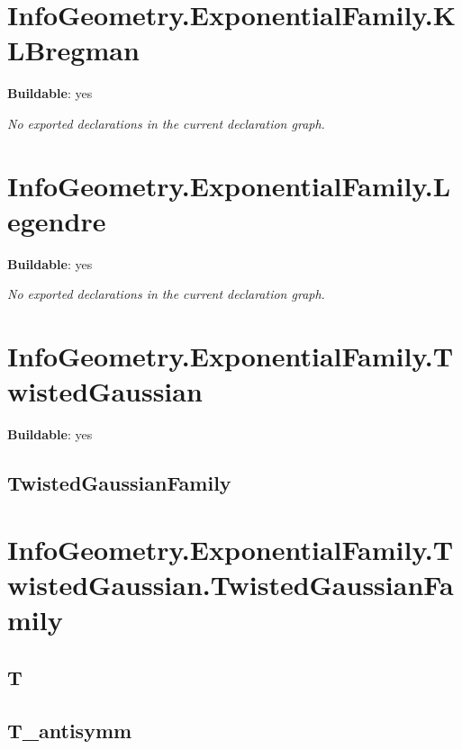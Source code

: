 \section{InfoGeometry.ExponentialFamily.KLBregman}

\noindent\textbf{Buildable}: yes

\noindent\emph{No exported declarations in the current declaration graph.}

\section{InfoGeometry.ExponentialFamily.Legendre}

\noindent\textbf{Buildable}: yes

\noindent\emph{No exported declarations in the current declaration graph.}

\section{InfoGeometry.ExponentialFamily.TwistedGaussian}

\noindent\textbf{Buildable}: yes

\subsection*{TwistedGaussianFamily}

\begin{theorem}[blueprint="infogeometry:exponentialfamily:twistedgaussian:twistedgaussianfamily"]
\end{theorem}

\section{InfoGeometry.ExponentialFamily.TwistedGaussian.TwistedGaussianFamily}

\subsection*{T}

\begin{theorem}[blueprint="infogeometry:exponentialfamily:twistedgaussian:twistedgaussianfamily:t"]
\end{theorem}

\subsection*{T_antisymm}

